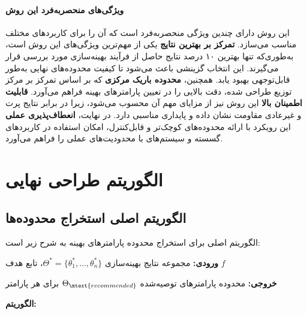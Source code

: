 \paragraph{ویژگی‌های منحصربه‌فرد این روش}

این روش دارای چندین ویژگی منحصربه‌فرد است که آن را برای کاربردهای مختلف مناسب می‌سازد. \textbf{تمرکز بر بهترین نتایج} یکی از مهم‌ترین ویژگی‌های این روش است، به‌طوری‌که تنها بهترین ۱۰ درصد نتایج حاصل از فرآیند بهینه‌سازی مورد بررسی قرار می‌گیرند. این انتخاب گزینشی باعث می‌شود تا کیفیت محدوده‌های نهایی به‌طور قابل‌توجهی بهبود یابد. همچنین، \textbf{محدوده باریک مرکزی} که بر اساس تمرکز بر مرکز توزیع طراحی شده، دقت بالایی را در تعیین پارامترهای بهینه فراهم می‌آورد. \textbf{قابلیت اطمینان بالا} این روش نیز از مزایای مهم آن محسوب می‌شود، زیرا در برابر نتایج پرت و غیرعادی مقاومت نشان داده و پایداری مناسبی دارد. در نهایت، \textbf{انعطاف‌پذیری عملی} این رویکرد با ارائه محدوده‌های کوچک‌تر و قابل‌کنترل، امکان استفاده در کاربردهای گسسته و سیستم‌های با محدودیت‌های عملی را فراهم می‌آورد.

\section{الگوریتم طراحی نهایی}

\subsection{الگوریتم اصلی استخراج محدوده‌ها}

الگوریتم اصلی برای استخراج محدوده پارامترهای بهینه به شرح زیر است:

\textbf{ورودی:} مجموعه نتایج بهینه‌سازی $\Theta^* = \{\theta_1^*, \dots, \theta_n^*\}$، تابع هدف $f$

\textbf{خروجی:} محدوده پارامترهای توصیه‌شده $\Theta_{\mtext{recommended}}$ برای هر پارامتر

\textbf{الگوریتم:}


